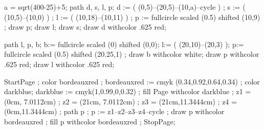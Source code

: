 %
\def\stackrelo#1#2{\mathrel{\mathop{#1}\limits^{\small #2}}}
\def\stackrelu#1#2{\mathrel{\mathop{#1}\limits^{\small #2}}}

%
\def\abs#1{\left| #1 \right|}
\def\norm#1{\left|\left| #1 \right|\right|}
\def\ord{{\rm ord}}
\def\Log{{\rm Log}}
\def\ZZ{$Z\mkern-16mu_{\textstyle Z}\mkern5mu$}
\def\Res{{\rm Res}}
\def\div{{\rm div}}
\def\dim{{\rm dim}}
\def\core{{\rm kern}}
\def\bild{{\rm bild}}
\def\grad{{\rm grad}}

%
\def\lightning{\symbol[wasy general][lightning]}
\def\iddots{\mirror{\ddots}}
%


%
\def\warning{\inmargin{\reuseMPgraphic{achtung}}\underbar{Vorsicht:}}
a = sqrt(400-25)+5;
path d, s, l, p;
d := ( (0,5)--(20,5)--(10,a)--cycle )  ;
s := ( (10,5)--(10,0) ) ;
l := ( (10,18)--(10,11) ) ;
p := fullcircle scaled (0.5) shifted (10,9) ; 
draw p;
draw l;
draw s;
draw d withcolor .625 red;
\stopreusableMPgraphic

\def\notice{\inmargin{\reuseMPgraphic{hinweis}}\underbar{Hinweis: }}
path l, p, b;
b:= fullcircle scaled (0) shifted (0,0);
l:= ( (20,10)--(20,3) );
p:= fullcircle scaled (0.5) shifted (20.25,1) ;
draw b withcolor white;
draw p withcolor .625 red;
draw l withcolor .625 red;
\stopreusableMPgraphic

%
	StartPage ;
		color bordeauxred ; bordeauxred := cmyk (0.34,0.92,0.64,0.34) ;
		color darkblue; darkblue := cmyk(1,0.99,0,0.32) ;
		fill Page withcolor darkblue ;
		z1 = (0cm, 7.0112cm) ;
		z2 = (21cm, 7.0112cm) ;
		z3 = (21cm,11.3444cm) ;
		z4 = (0cm,11.3444cm) ;
		path p ; p := z1--z2--z3--z4--cycle ;
		draw p withcolor bordeauxred ;
		fill p withcolor bordeauxred ;
	StopPage;
\stopuseMPgraphic


%
\definecolor[bordeauxred][c=.34, m=.92, y=.64, k=.34]
\definecolor[darkblue][c=1,m=.99,y=0,k=.32]

\stopenvironment
